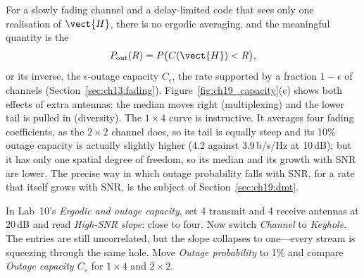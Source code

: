 For a slowly fading channel and a delay-limited code that sees only one realisation of
$\vect{H}$, there is no ergodic averaging, and the meaningful quantity is the 
\begin{equation}
P_{\text{out}}(R)=P\big(C(\vect{H})<R\big),
\end{equation}
or its inverse, the $\epsilon$-outage capacity $C_\epsilon$, the rate supported by a fraction
$1-\epsilon$ of channels (Section~\ref{sec:ch13:fading}). Figure~\ref{fig:ch19_capacity}(c) shows
both effects of extra antennas: the median moves right (multiplexing) and the lower tail is pulled
in (diversity). The $1\times4$ curve is instructive. It averages four fading coefficients, as the
$2\times2$ channel does, so its tail is equally steep and its 10\% outage capacity is actually
slightly higher (4.2 against 3.9\,b/s/Hz at 10\,dB); but it has only one spatial degree of freedom,
so its median and its growth with SNR are lower. The precise way in which outage probability falls
with SNR, for a rate that itself grows with SNR, is the subject of Section~\ref{sec:ch19:dmt}.


\begin{tryit}
In Lab~10's \emph{Ergodic and outage capacity}, set 4 transmit and 4 receive antennas at 20\,dB and
read \emph{High-SNR slope}: close to four. Now switch \emph{Channel} to \emph{Keyhole}. The entries
are still uncorrelated, but the slope collapses to one---every stream is squeezing through the same
hole. Move \emph{Outage probability} to 1\% and compare \emph{Outage capacity $C_\varepsilon$} for
$1\times4$ and $2\times2$.
\end{tryit}

